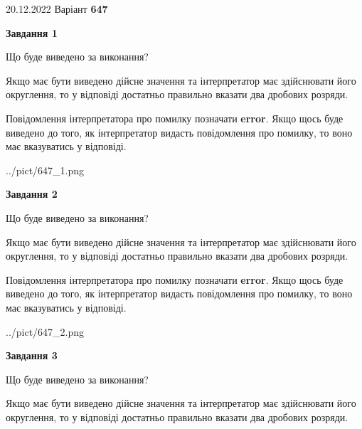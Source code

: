 \documentclass[12pt, ukrainian]{article}
\begin{document}
{20.12.2022 Варіант \No \textbf { 647 }\par}
{
\begin {Large}

{\begin {center}\textbf{Завдання 1}\end {center}}\par
Що буде виведено за виконання? \par

Якщо має бути виведено дійсне значення та інтерпретатор має здійснювати його округлення, 
то у відповіді достатньо правильно вказати два дробових розряди.

Повідомлення інтерпретатора про помилку позначати \textbf{error}.
Якщо щось буде виведено до того, як інтерпретатор видасть повідомлення про помилку, 
то воно має вказуватись у відповіді. \par

\begin{center}
	{../pict/647_1.png}
\end{center}
\newpage

{\begin {center}\textbf{Завдання 2}\end {center}}\par
Що буде виведено за виконання? \par

Якщо має бути виведено дійсне значення та інтерпретатор має здійснювати його округлення, 
то у відповіді достатньо правильно вказати два дробових розряди.

Повідомлення інтерпретатора про помилку позначати \textbf{error}.
Якщо щось буде виведено до того, як інтерпретатор видасть повідомлення про помилку, 
то воно має вказуватись у відповіді. \par

\begin{center}
	{../pict/647_2.png}
\end{center}
\newpage

{\begin {center}\textbf{Завдання 3}\end {center}}\par
Що буде виведено за виконання? \par

Якщо має бути виведено дійсне значення та інтерпретатор має здійснювати його округлення, 
то у відповіді достатньо правильно вказати два дробових розряди.


\end{Large}}
\end{document}
